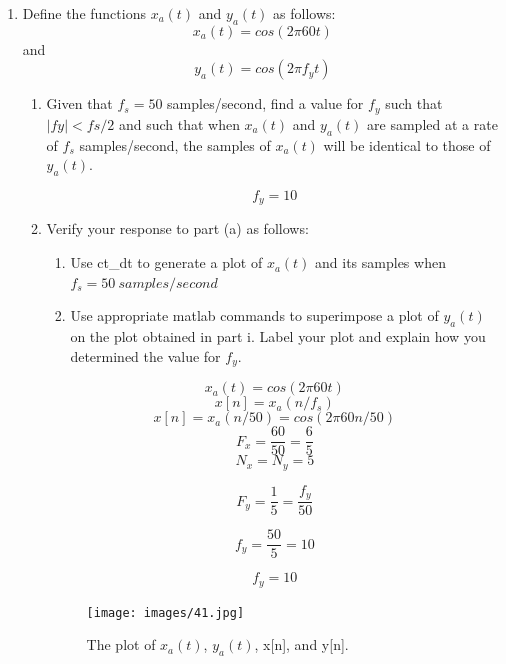 \documentclass[12pt]{article}
\begin{document}
\begin{enumerate}
\begin{enumerate}
\end{enumerate}






\item Define the functions $x_a(t)$ and $y_a(t)$ as follows:
$$x_a(t) = cos(2\pi 60 t)$$ 
and 
$$y_a(t) =  cos(2\pi f_y t)$$
\begin{enumerate}









\item Given that $f_s = 50$ samples/second, find a value for $f_y$ such that $|fy|< fs/2$ and such that when $x_a(t)$ and $y_a(t)$ are sampled at a rate of $f_s$ samples/second, the samples of $x_a(t)$ will be identical to those of $y_a(t)$.



$$\boxed{f_y = 10}$$










\item Verify your response to part (a) as follows:
\begin{enumerate}

\item Use ct\_dt to generate a plot of $x_a(t)$ and its samples when $f_s = 50\ samples/second$
\item Use appropriate matlab commands to superimpose a plot of $y_a(t)$ on the plot obtained in part i. Label your plot and explain how you determined the value for
$f_y$.
\end{enumerate}
$$x_a(t) = cos(2\pi60t)$$
$$x[n] = x_a(n/f_s)$$
$$x[n] = x_a(n/50) = cos(2\pi60n/50)$$
$$F_x = \frac{60}{50} = \frac{6}{5}$$
$$N_x = N_y = 5$$

$$F_y = \frac{1}{5} = \frac{f_y}{50}$$

$$f_y = \frac{50}{5} = 10$$


$$\boxed{f_y = 10}$$


\begin{figure}[H]
    \centering
    \begin{minipage}[b]{0.7\textwidth}
        \texttt{[image: images/41.jpg]}
    \end{minipage}
    \caption{The plot of $x_a(t)$, $y_a(t)$, x[n], and y[n].}
    \label{fig:41}
\end{figure}

\end{enumerate}
\end{enumerate}
\end{document}

